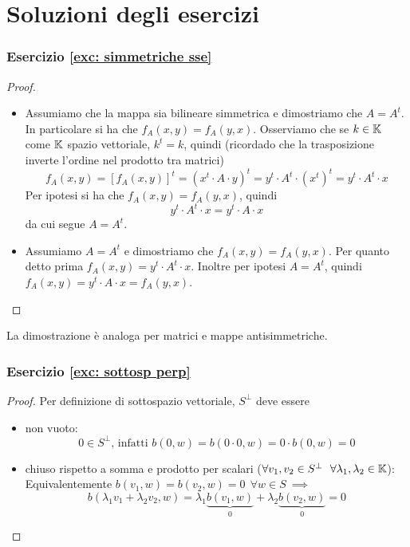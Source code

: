 \documentclass{article}     %
\begin{document}
\section{Soluzioni degli esercizi}
\subsubsection*{Esercizio \ref{exc: simmetriche sse}}\label{sol: simmetriche sse}
\begin{proof}~
    \begin{itemize}
        \item [\say{$\Rarr$}] Assumiamo che la mappa sia bilineare simmetrica e dimostriamo che $A=A^t$. In particolare si ha che $f_A(x,y)=f_A(y,x)$. Osserviamo che se $k \in \mathbb{K}$ come $\mathbb{K}$ spazio vettoriale, $k^t=k$, quindi (ricordado che la trasposizione inverte l'ordine nel prodotto tra matrici)
        \[f_A(x,y)=[f_A(x,y)]^t=\left( x^t\cdot A \cdot y \right)^t= y^t\cdot  A^t \cdot \left( x^t \right)^t= y^t\cdot A^t \cdot x \] 
        Per ipotesi si ha che $f_A(x,y)=f_A(y,x)$, quindi 
        \[y^t\cdot A^t \cdot x= y^t\cdot A \cdot x\]
        da cui segue $A=A^t$.
        \item [\say{$\Larr$}] Assumiamo $A=A^t$ e dimostriamo che $f_A(x,y)=f_A(y,x)$. Per quanto detto prima $f_A(x,y)=y^t\cdot A^t\cdot x$. Inoltre per ipotesi $A=A^t$, quindi $f_A(x,y)=y^t\cdot A\cdot x=f_A(y,x)$.
    \end{itemize}
\end{proof}
La dimostrazione è analoga per matrici e mappe antisimmetriche.

\subsubsection*{Esercizio \ref{exc: sottosp perp}}\label{sol: sottosp perp}
\begin{proof}Per definizione di sottospazio vettoriale, $S^\perp$ deve essere
    \begin{itemize}
        \item non vuoto:
        \[0\in S^\perp\text{, infatti }b(0,w)=b(0\cdot 0,w)=0\cdot b(0,w)=0\]
        \item chiuso rispetto a somma e prodotto per scalari ($\forall v_1,v_2\in S^\perp\ \ \forall \lambda_1, \lambda_2\in \mathbb{K}$):\\
        Equivalentemente $b(v_1,w)=b(v_2,w)=0\ \ \forall w\in S\ \implies$
        \[b(\lambda_1v_1+\lambda_2v_2,w)= \lambda_1\underbrace{b(v_1,w)}_0+\lambda_2\underbrace{b(v_2,w)}_0= 0\]
    \end{itemize}
\end{proof}
\end{document}
